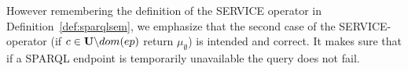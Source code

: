 			However remembering the definition of the SERVICE
			operator in Definition~\ref{def:sparqlsem}, we emphasize
			that the second case of the SERVICE-operator (if $c \in \mathbf{U} \backslash
			dom(ep)$ return $\mu_\emptyset$) is intended and correct. It makes
			sure that if a SPARQL endpoint is temporarily unavailable the query
			does not fail.
			

